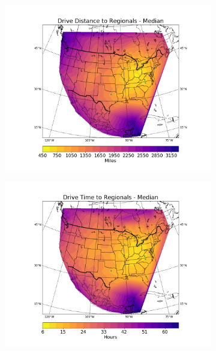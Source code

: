 \documentclass[11pt,twocolumn]{article}
\begin{document}
\begin{figure}
\begin{subfigure}{.5\textwidth}
  \includegraphics[height=.3\textheight]{../figs/Figure_9}
\end{subfigure}
\begin{subfigure}{.5\textwidth}
  \includegraphics[height=.3\textheight]{../figs/Figure_10}
\end{subfigure}
\begin{subfigure}{.5\textwidth}

\end{subfigure}
\end{figure}
\end{document}
